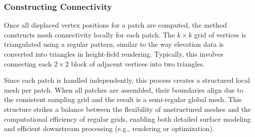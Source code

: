 \subsubsection{Constructing Connectivity}

Once all displaced vertex positions for a patch are computed, the method constructs mesh connectivity locally for each patch. 
The $k \times k$ grid of vertices is triangulated using a regular pattern, similar to the way elevation data is converted into triangles in height-field rendering. 
Typically, this involves connecting each $2 \times 2$ block of adjacent vertices into two triangles. 

Since each patch is handled independently, this process creates a structured local mesh per patch. 
When all patches are assembled, their boundaries align due to the consistent sampling grid and the result is a semi-regular global mesh. 
This structure strikes a balance between the flexibility of unstructured meshes and the computational efficiency of regular grids, enabling both detailed surface modeling and efficient downstream processing (e.g., rendering or optimization). 







